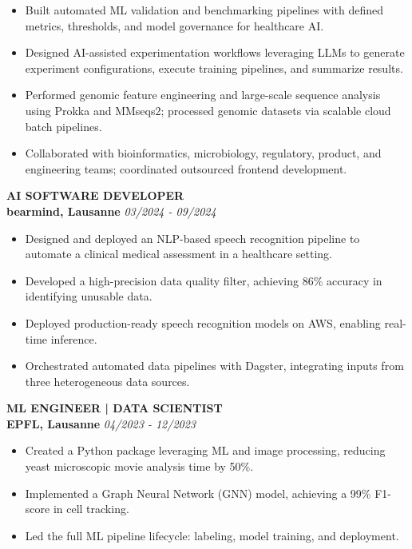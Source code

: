 \documentclass[9pt, letterpaper]{extarticle}
\begin{document}
\begin{minipage}[t]{0.64\textwidth}
\begin{itemize}
    \item Built automated ML validation and benchmarking pipelines with defined metrics, thresholds, and model governance for healthcare AI.

    \item Designed AI-assisted experimentation workflows leveraging LLMs to generate experiment configurations, execute training pipelines, and summarize results.
    
    \item Performed genomic feature engineering and large-scale sequence analysis using Prokka and MMseqs2; processed genomic datasets via scalable cloud batch pipelines.
        
    \item Collaborated with bioinformatics, microbiology, regulatory, product, and engineering teams; coordinated outsourced frontend development.
\end{itemize}
\vspace{0.2cm}

\textbf{AI SOFTWARE DEVELOPER} \\
\textbf{bearmind, Lausanne} \hfill \textit{03/2024 - 09/2024}
\small
\begin{itemize}
    \item Designed and deployed an NLP-based speech recognition pipeline to automate a clinical medical assessment in a healthcare setting.
    \item Developed a high-precision data quality filter, achieving 86\% accuracy in identifying unusable data.
    \item Deployed production-ready speech recognition models on AWS, enabling real-time inference.
    \item Orchestrated automated data pipelines with Dagster, integrating inputs from three heterogeneous data sources.
\end{itemize}

\vspace{0.2cm}

\textbf{ML ENGINEER | DATA SCIENTIST} \\
\textbf{EPFL, Lausanne} \hfill \textit{04/2023 - 12/2023}
\small
\begin{itemize}
    \item Created a Python package leveraging ML and image processing, reducing yeast microscopic movie analysis time by 50\%.
    \item Implemented a Graph Neural Network (GNN) model, achieving a 99\% F1-score in cell tracking.
    \item Led the full ML pipeline lifecycle: labeling, model training, and deployment.
\end{itemize}


\end{minipage}
\end{document}
